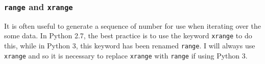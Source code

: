 \documentclass[Pydata.tex]{subfiles}
\begin{document}
\subsubsection*{\texttt{range} and \texttt{xrange}}
It is often useful to generate a sequence of number for use when iterating over the some data. In Python
2.7, the best practice is to use the keyword \texttt{xrange} to do this, while in Python 3, this keyword has been
renamed \texttt{range}. I will always use \texttt{xrange} and so it is necessary to replace \texttt{xrange} with \texttt{range} if using Python
3.
\end{document}
